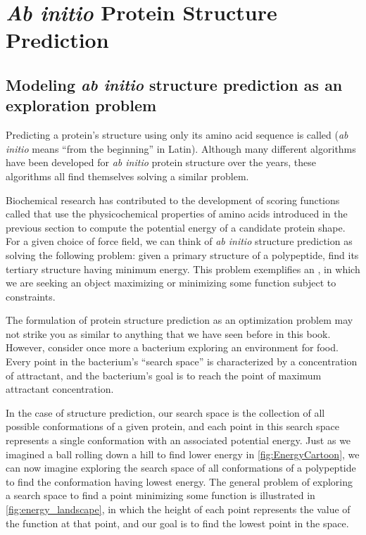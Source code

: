 \FloatBarrier
{}

\section{\textit{Ab initio} Protein Structure Prediction}
\label{sec:ab_initio}

\subsection{Modeling \textit{ab initio} structure prediction as an exploration problem}

Predicting a protein’s structure using only its amino acid sequence is called  (\textit{ab initio} means “from the beginning” in Latin). Although many different algorithms have been developed for \textit{ab initio} protein structure over the years, these algorithms all find themselves solving a similar problem.

Biochemical research has contributed to the development of scoring functions called  that use the physicochemical properties of amino acids introduced in the previous section to compute the potential energy of a candidate protein shape. For a given choice of force field, we can think of \textit{ab initio} structure prediction as solving the following problem: given a primary structure of a polypeptide, find its tertiary structure having minimum energy. This problem exemplifies an , in which we are seeking an object maximizing or minimizing some function subject to constraints.

The formulation of protein structure prediction as an optimization problem may not strike you as similar to anything that we have seen before in this book. However, consider once more a bacterium exploring an environment for food. Every point in the bacterium's ``search space'' is characterized by a concentration of attractant, and the bacterium's goal is to reach the point of maximum attractant concentration.

In the case of structure prediction, our search space is the collection of all possible conformations of a given protein, and each point in this search space represents a single conformation with an associated potential energy.  Just as we imagined a ball rolling down a hill to find lower energy in \autoref{fig:EnergyCartoon}, we can now imagine exploring the search space of all conformations of a polypeptide to find the conformation having lowest energy. The general problem of exploring a search space to find a point minimizing some function is illustrated in \autoref{fig:energy_landscape}, in which the height of each point represents the value of the function at that point, and our goal is to find the lowest point in the space.\\

